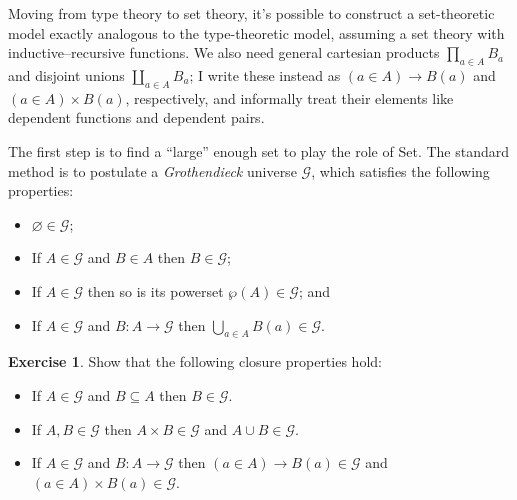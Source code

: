 \documentclass{article}
\renewcommand{\_}{\textrm{\textscale{.5}{\textunderscore}}}
\newcommand{\sFun}[3]{(#1 \mathbin{\in} #2) \mathrel{\to} #3}
\newcommand{\sPair}[3]{(#1 \mathbin{\in} #2) \mathrel{\times} #3}
\theoremstyle{definition}
\newtheorem{exercise}[definition]{Exercise}
\theoremstyle{plain}
\begin{document}
Moving from type theory to set theory,
it's possible to construct a set-theoretic model exactly analogous to the type-theoretic model,
assuming a set theory with inductive--recursive functions.
We also need general cartesian products $\prod_{a \in A} B_a$
and disjoint unions $\coprod_{a \in A} B_a$;
I write these instead as $\sFun{a}{A}{B(a)}$ and $\sPair{a}{A}{B(a)}$, respectively,
and informally treat their elements like dependent functions and dependent pairs.

The first step is to find a ``large'' enough set to play the role of {\codefont Set}.
The standard method is to postulate a \emph{Grothendieck} universe $\mathcal{G}$,
which satisfies the following properties:

\begin{itemize}
    \item $\varnothing \in \mathcal{G}$;
    \item If $A \in \mathcal{G}$ and $B \in A$ then $B \in \mathcal{G}$;
    \item If $A \in \mathcal{G}$ then so is its powerset $\wp(A) \in \mathcal{G}$; and
    \item If $A \in \mathcal{G}$ and $B : A \to \mathcal{G}$ then $\bigcup_{a \in A} B(a) \in \mathcal{G}$.
\end{itemize}

\begin{exercise}
Show that the following closure properties hold:
\begin{itemize}
    \item If $A \in \mathcal{G}$ and $B \subseteq A$ then $B \in \mathcal{G}$.
    \item If $A, B \in \mathcal{G}$ then $A \times B \in \mathcal{G}$ and $A \cup B \in \mathcal{G}$.
    \item If $A \in \mathcal{G}$ and $B : A \to \mathcal{G}$ then
    $\sFun{a}{A}{B(a)} \in \mathcal{G}$ and $\sPair{a}{A}{B(a)} \in \mathcal{G}$.
\end{itemize}
\end{exercise}
\end{document}

